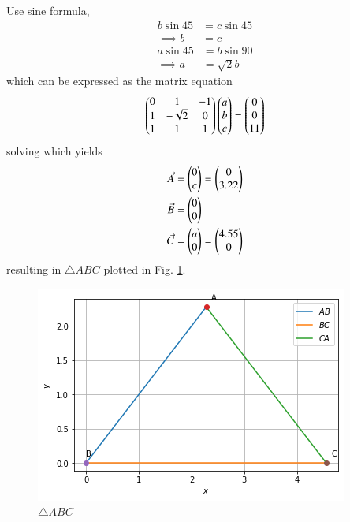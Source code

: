 Use sine formula, 
\begin{align}
b\sin{45}&=c\sin{45}
\\
\implies b&=c
\end{align}
\begin{align}
a\sin{45}&=b\sin{90}
\\
\implies a&=\sqrt{2}b
\end{align}
which can be expressed as the matrix equation
\begin{align}
\label{tri/3/eq:1}
\begin{pmatrix}0 & 1 & -1 \\ 1& -\sqrt{2}& 0 \\1& 1& 1\end{pmatrix}\begin{pmatrix}a\\b\\c\end{pmatrix} = \begin{pmatrix}0\\0\\11\end{pmatrix}
\end{align}
solving which yields
\begin{align}
    \Vec{A}&=\begin{pmatrix}0\\c\end{pmatrix}=\begin{pmatrix}0\\3.22\end{pmatrix}\\\Vec{B}&=\begin{pmatrix}0\\0\end{pmatrix}\\\Vec{C}&=\begin{pmatrix}a\\0\end{pmatrix}=\begin{pmatrix}4.55\\0\end{pmatrix}
\end{align}
resulting in $\triangle ABC$ plotted in Fig. \ref{tri/3/fig:triangle ABC}.
%
\begin{figure}[h!]
\centering
\includegraphics[width=\columnwidth]{solutions/triangle/3/Figure1(2).png}
\caption{$\triangle ABC$}
\label{tri/3/fig:triangle ABC}
\end{figure}


